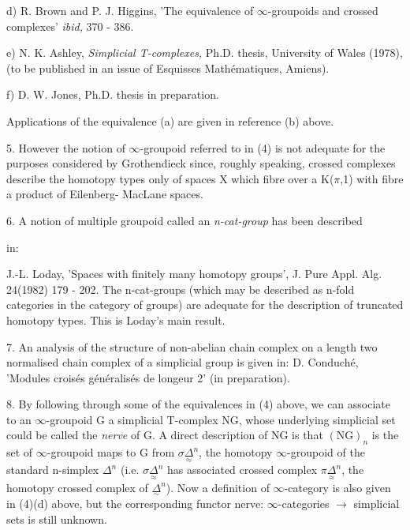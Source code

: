 \documentclass[11pt]{article}
\newcommand{\scanpage}[1]{\par\bigskip\noindent{\small\sffamily[scan #1]}\par}
\newcommand{\mspage}[1]{{\small\sffamily[p.\,#1]}}
\newcommand{\hand}[1]{\textcolor{blue}{#1}}
\begin{document}
d) R. Brown and P. J. Higgins, 'The equivalence of $\infty$-groupoids and
crossed complexes' \textit{ibid,} 370 - 386.

e) N. K. Ashley, \textit{Simplicial T-complexes,} Ph.D. thesis, University
of Wales (1978),(to be published in an issue of Esquisses
Mathématiques, Amiens).

f) D. W. Jones, Ph.D. thesis in preparation.

Applications of the equivalence (a) are given in reference (b)
above.

5. However the notion of $\infty$-groupoid referred to in (4) is not adequate
for the purposes considered by Grothendieck since, roughly speaking,
crossed complexes describe the homotopy types only of spaces X
which fibre over a K($\pi$,1) with fibre a product of Eilenberg-
MacLane spaces.

6. A notion of multiple groupoid called an \textit{n-cat-group} has been described

\mspage{\hand{119}}

\clearpage
\scanpage{134-2/119}
\mspage{-3-}

in:

J.-L. Loday, 'Spaces with finitely many homotopy groups', J. Pure
Appl. Alg.  24(1982) 179 - 202.
The n-cat-groups (which may be described as n-fold categories in
the category of groups) are adequate for the description of
truncated homotopy types.  This is Loday's main result.

7. An analysis of the structure of non-abelian chain complex on a
length two normalised chain complex of a simplicial group is
given in:
D. Conduché, 'Modules croisés généralisés de longeur 2' (in
preparation).

8. By following through some of the equivalences in (4) above, we
can associate to an $\infty$-groupoid G \quad a simplicial T-complex NG, whose
underlying simplicial set could be called the \textit{nerve} of G.  A
direct description of NG is that $(\mathrm{NG})_{n}$ is the set of
$\infty$-groupoid maps  to G from $\sigma\underset{\approx}{\Delta}^{n}$, the homotopy $\infty$-groupoid of the
standard n-simplex $\Delta^{n}$ (i.e. $\sigma\underset{\approx}{\Delta}^{n}$ has associated crossed complex $\pi\underset{\approx}{\Delta}^{n}$,
the homotopy crossed complex of $\underset{\sim}{\Delta}^{n}$).
Now a definition of $\infty$-category is also given in (4)(d) above,
but the corresponding functor nerve: $\infty$-categories $\longrightarrow$ simplicial
sets is still  unknown.
\end{document}
